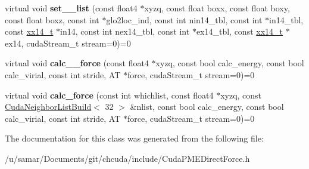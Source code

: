 \begin{DoxyCompactItemize}
virtual void {\bfseries set\+\_\+\_\+list} (const float4 $\ast$xyzq, const float boxx, const float boxy, const float boxz, const int $\ast$glo2loc\+\_\+ind, const int nin14\+\_\+tbl, const int $\ast$in14\+\_\+tbl, const \hyperlink{structxx14__t}{xx14\+\_\+t} $\ast$in14, const int nex14\+\_\+tbl, const int $\ast$ex14\+\_\+tbl, const \hyperlink{structxx14__t}{xx14\+\_\+t} $\ast$ex14, cuda\+Stream\+\_\+t stream=0)=0
\item 
\hypertarget{classCudaPMEDirectForceBase_a537ecd649336b282e150995ca141ccb8}{}\label{classCudaPMEDirectForceBase_a537ecd649336b282e150995ca141ccb8} 
virtual void {\bfseries calc\+\_\+\_\+force} (const float4 $\ast$xyzq, const bool calc\+\_\+energy, const bool calc\+\_\+virial, const int stride, AT $\ast$force, cuda\+Stream\+\_\+t stream=0)=0
\item 
\hypertarget{classCudaPMEDirectForceBase_a0484932e1c3d441f66b3b1ada4921e7d}{}\label{classCudaPMEDirectForceBase_a0484932e1c3d441f66b3b1ada4921e7d} 
virtual void {\bfseries calc\+\_\+force} (const int whichlist, const float4 $\ast$xyzq, const \hyperlink{classCudaNeighborListBuild}{Cuda\+Neighbor\+List\+Build}$<$ 32 $>$ \&nlist, const bool calc\+\_\+energy, const bool calc\+\_\+virial, const int stride, AT $\ast$force, cuda\+Stream\+\_\+t stream=0)=0
\end{DoxyCompactItemize}


The documentation for this class was generated from the following file\+:\begin{DoxyCompactItemize}
\item 
/u/samar/\+Documents/git/chcuda/include/Cuda\+P\+M\+E\+Direct\+Force.\+h\end{DoxyCompactItemize}

